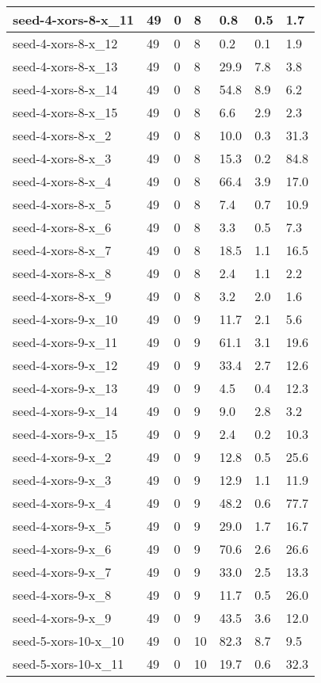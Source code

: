\begin{scriptsize}
\begin{longtable}{|p{5cm}|l|l|l|l|l|l|}
seed-4-xors-8-x\_11&49&0&8&0.8&0.5&1.7 \\ \hline 
seed-4-xors-8-x\_12&49&0&8&0.2&0.1&1.9 \\ \hline 
seed-4-xors-8-x\_13&49&0&8&29.9&7.8&3.8 \\ \hline 
seed-4-xors-8-x\_14&49&0&8&54.8&8.9&6.2 \\ \hline 
seed-4-xors-8-x\_15&49&0&8&6.6&2.9&2.3 \\ \hline 
seed-4-xors-8-x\_2&49&0&8&10.0&0.3&31.3 \\ \hline 
seed-4-xors-8-x\_3&49&0&8&15.3&0.2&84.8 \\ \hline 
seed-4-xors-8-x\_4&49&0&8&66.4&3.9&17.0 \\ \hline 
seed-4-xors-8-x\_5&49&0&8&7.4&0.7&10.9 \\ \hline 
seed-4-xors-8-x\_6&49&0&8&3.3&0.5&7.3 \\ \hline 
seed-4-xors-8-x\_7&49&0&8&18.5&1.1&16.5 \\ \hline 
seed-4-xors-8-x\_8&49&0&8&2.4&1.1&2.2 \\ \hline 
seed-4-xors-8-x\_9&49&0&8&3.2&2.0&1.6 \\ \hline 
seed-4-xors-9-x\_10&49&0&9&11.7&2.1&5.6 \\ \hline 
seed-4-xors-9-x\_11&49&0&9&61.1&3.1&19.6 \\ \hline 
seed-4-xors-9-x\_12&49&0&9&33.4&2.7&12.6 \\ \hline 
seed-4-xors-9-x\_13&49&0&9&4.5&0.4&12.3 \\ \hline 
seed-4-xors-9-x\_14&49&0&9&9.0&2.8&3.2 \\ \hline 
seed-4-xors-9-x\_15&49&0&9&2.4&0.2&10.3 \\ \hline 
seed-4-xors-9-x\_2&49&0&9&12.8&0.5&25.6 \\ \hline 
seed-4-xors-9-x\_3&49&0&9&12.9&1.1&11.9 \\ \hline 
seed-4-xors-9-x\_4&49&0&9&48.2&0.6&77.7 \\ \hline 
seed-4-xors-9-x\_5&49&0&9&29.0&1.7&16.7 \\ \hline 
seed-4-xors-9-x\_6&49&0&9&70.6&2.6&26.6 \\ \hline 
seed-4-xors-9-x\_7&49&0&9&33.0&2.5&13.3 \\ \hline 
seed-4-xors-9-x\_8&49&0&9&11.7&0.5&26.0 \\ \hline 
seed-4-xors-9-x\_9&49&0&9&43.5&3.6&12.0 \\ \hline 
seed-5-xors-10-x\_10&49&0&10&82.3&8.7&9.5 \\ \hline 
seed-5-xors-10-x\_11&49&0&10&19.7&0.6&32.3 \\ \hline 

\end{longtable}
\end{scriptsize}

